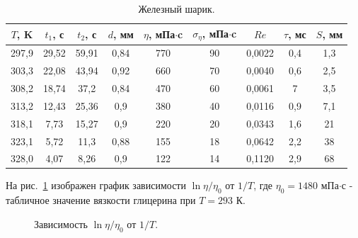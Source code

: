 \documentclass[a4paper,12pt]{article} %
\begin{document}
	\begin{table}[H]
		\caption{Железный шарик.}
		\label{table:Fe_n}
\begin{tabular}{|c|c|c|c|c|c|c|c|c|}
\hline
$T$, K & $t_1$, с & $t_2$, с & $d$, мм & $\eta$, мПа$\cdot$c & $\sigma_\eta$, мПа$\cdot$c & $Re$   & $\tau$, мс & $S$, мм \\ \hline
297,9  & 29,52    & 59,91    & 0,84    & 770                 & 90                         & 0,0022 & 0,4        & 1,3     \\ \hline
303,3  & 22,08    & 43,94    & 0,92    & 660                 & 70                         & 0,0040 & 0,6        & 2,5     \\ \hline
308,2  & 18,74    & 37,2     & 0,84    & 470                 & 60                         & 0,0061 & 7          & 3,5     \\ \hline
313,2  & 12,43    & 25,36    & 0,9     & 380                 & 40                         & 0,0116 & 0,9        & 7,1     \\ \hline
318,1  & 7,73     & 15,27    & 0,9     & 220                 & 20                         & 0,0343 & 1,6        & 21      \\ \hline
323,1  & 5,72     & 11,3     & 0,88    & 155                 & 18                         & 0,0642 & 2,2        & 38      \\ \hline
328,0  & 4,07     & 8,26     & 0,9     & 122                 & 14                         & 0,1120 & 2,9        & 68      \\ \hline
\end{tabular}
	\end{table}
		
	На рис.~\ref{ris:Graph_1} изображен график зависимости $\ln{\eta / \eta_0}$ от $1 / T$, где $\eta_0 = 1480$ мПа$\cdot$с - табличное значение вязкости глицерина при $T = 293$ К.


	
\newpage
		\begin{figure}[H]
		\caption{Зависимость $\ln{\eta / \eta_0}$ от $1 / T$.}
		\label{ris:Graph_1}
	\end{figure}
	
\end{document}

